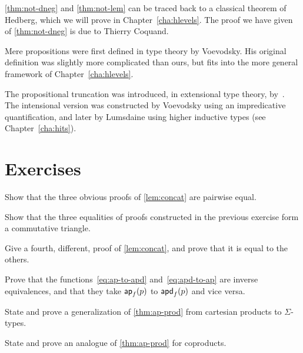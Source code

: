 \autoref{thm:not-dneg} and \autoref{thm:not-lem} can be traced back to a classical theorem of Hedberg, which we will prove in Chapter~\ref{cha:hlevels}.
The proof we have given of \autoref{thm:not-dneg} is due to Thierry Coquand.

Mere propositions were first defined in type theory by Voevodsky.
His original definition was slightly more complicated than ours, but fits into the more general framework of Chapter~\ref{cha:hlevels}.

The propositional truncation was introduced, in extensional type theory, by~\cite{ab:bracket-types}.
The intensional version was constructed by Voevodsky using an impredicative quantification, and later by Lumsdaine using higher inductive types (see Chapter~\ref{cha:hits}).



\section*{Exercises}
\label{basics:exercises}

\begin{ex}\label{ex:basics:concat}
  Show that the three obvious proofs of \autoref{lem:concat} are pairwise equal.
\end{ex}

\begin{ex}
  Show that the three equalities of proofs constructed in the previous exercise form a commutative triangle.
\end{ex}

\begin{ex}
  Give a fourth, different, proof of \autoref{lem:concat}, and prove that it is equal to the others.
\end{ex}

\begin{ex}
  Prove that the functions~\eqref{eq:ap-to-apd} and~\eqref{eq:apd-to-ap} are inverse equivalences, and that they take $\mathsf{ap}_{f}(p)$ to $\mathsf{apd}_{f} (p)$ and vice versa.
\end{ex}

\begin{ex}\label{ex:ap-sigma}
  State and prove a generalization of \autoref{thm:ap-prod} from cartesian products to $\Sigma$-types.
\end{ex}

\begin{ex}
  State and prove an analogue of \autoref{thm:ap-prod} for coproducts.
\end{ex}

